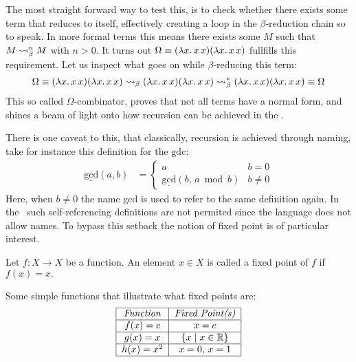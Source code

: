 \documentclass[12pt]{book}
\begin{document}
The most straight forward way to test this, is to check whether there exists some term that reduces to itself, effectively creating a loop in the $\beta$-reduction chain so to speak. In more formal terms this means there exists some $M$ such that \( M \mathrel{\leadsto}_\beta^n M \) with $ n > 0 $. It turns out \( \Omega \equiv (\lambda x . \, x \, x) (\lambda x . \, x \, x) \) fullfills this requirement. Let us inspect what goes on while $\beta$-reducing this term:
\[
  \Omega \equiv (\lambda x . \, x \, x) (\lambda x . \, x \, x) \mathrel{\leadsto}_\beta (\lambda x . \, x \, x) (\lambda x . \, x \, x) \mathrel{\leadsto}_\beta^* (\lambda x . \, x \, x) (\lambda x . \, x \, x) \equiv \Omega
\]
This so called $\Omega$-combinator, proves that not all terms have a normal form, and shines a beam of light onto how recursion can be achieved in the \lcalc.

There is one caveat to this, that classically, recursion is achieved through naming, take for instance this definition for the $\mathrm{gdc}$:
\begin{align*}
  \underline{\mathrm{gcd}}(a,b) &= 
                      \begin{cases}
                        a & b = 0 \\
                        \underline{\mathrm{gcd}}(b,\, a \bmod b) & b \neq 0
                      \end{cases}
\end{align*}
Here, when $b \neq 0$ the name gcd is used to refer to the same definition again. In the \lcalc \ such self-referencing definitions are not permited since the language does not allow names. To bypass this setback the notion of fixed point is of particular interest.
\begin{definition}
  Let \( f : X \to X \) be a function. An element \( x \in X \) is called a fixed point of \( f \) if \( f(x) = x. \)
\end{definition}
\begin{example} Some simple functions that illustrate what fixed points are:
  \[
    \begin{tabular}{|c|c|}
      \hline
      \textit{Function} & \textit{Fixed Point(s)} \\
      \hline
      $f(x) = c$ & $x = c$ \\
      \hline
      $g(x) = x$ & $\{ x \mid x \in \mathbb{R} \}$ \\
      \hline
      $h(x) = x^2$ & $ x = 0,\, x = 1 $ \\
      \hline
    \end{tabular}
  \]
\end{example}
\end{document}
